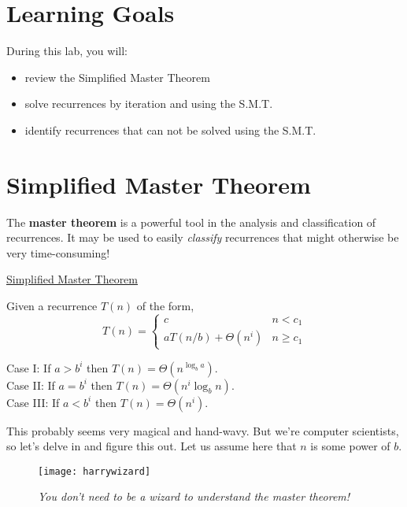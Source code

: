 

\section*{Learning Goals}
During this lab, you will:
\begin{itemize}
    \item review the Simplified Master Theorem
    \item solve recurrences by iteration and using the S.M.T.
    \item identify recurrences that can not be solved using the S.M.T.
\end{itemize}

\section*{Simplified Master Theorem}

The \textbf{master theorem} is a powerful tool in the analysis and classification of recurrences. It may be used to easily \textit{classify} recurrences that might otherwise be very time-consuming!

\begin{framed}
    \begin{center}\underline{Simplified Master Theorem}\end{center}
    Given a recurrence $T(n)$ of the form,
    $$
        T(n) = \left\{
        \begin{array}{lr}
            c & n < c_1\\
            a T(n/b) + \Theta(n^i) & n \geq c_1
        \end{array}\right.
    $$

    Case I: If $a > b^i$ then $T(n) = \Theta(n^{\log_b a})$.\\

    Case II: If $a = b^i$ then $T(n) = \Theta(n^i \log_b n)$.\\

    Case III: If $a < b^i$ then $T(n) = \Theta(n^i)$.
\end{framed}

This probably seems very magical and hand-wavy. But we're computer scientists, so let's delve in and figure this out. Let us assume here that $n$ is some power of $b$.

\begin{figure}[ht]
    \centering
    \texttt{[image: harrywizard]}
    \caption*{\textit{You don't need to be a wizard to understand the master theorem!}}
\end{figure}

